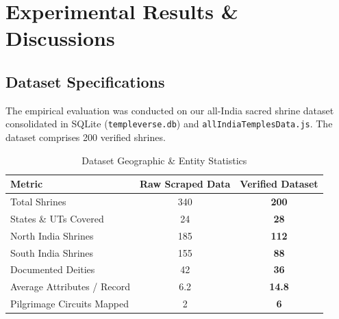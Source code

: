 \documentclass[lettersize,journal]{IEEEtran}
\begin{document}
\section{Experimental Results \& Discussions}
\subsection{Dataset Specifications}
The empirical evaluation was conducted on our all-India sacred shrine dataset consolidated in SQLite (\texttt{templeverse.db}) and \texttt{allIndiaTemplesData.js}. The dataset comprises 200 verified shrines.

\begin{table}[htbp]
\caption{Dataset Geographic \& Entity Statistics}
\centering
\begin{tabular}{lcc}
\toprule
\textbf{Metric} & \textbf{Raw Scraped Data} & \textbf{Verified Dataset} \\
\midrule
Total Shrines & 340 & \textbf{200} \\
States \& UTs Covered & 24 & \textbf{28} \\
North India Shrines & 185 & \textbf{112} \\
South India Shrines & 155 & \textbf{88} \\
Documented Deities & 42 & \textbf{36} \\
Average Attributes / Record & 6.2 & \textbf{14.8} \\
Pilgrimage Circuits Mapped & 2 & \textbf{6} \\
\bottomrule
\end{tabular}
\end{table}
\end{document}
